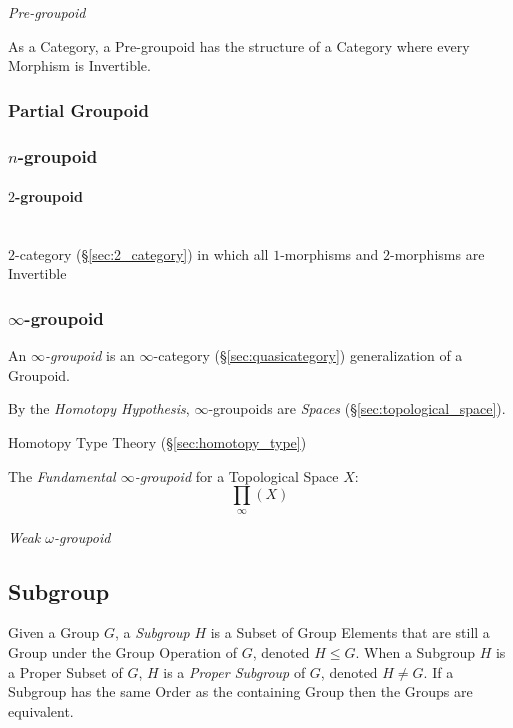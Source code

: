 \emph{Pre-groupoid}

As a Category, a Pre-groupoid has the structure of a Category where
every Morphism is Invertible.



\subsubsection{Partial Groupoid}\label{sec:partial_groupoid}

\subsubsection{$n$-groupoid}\label{sec:n_groupoid}

\paragraph{$2$-groupoid}\label{sec:2_groupoid}
\hfill \\

$2$-category (\S\ref{sec:2_category}) in which all $1$-morphisms and
$2$-morphisms are Invertible



\subsubsection{$\infty$-groupoid}\label{sec:infinity_groupoid}

An \emph{$\infty$-groupoid} is an $\infty$-category
(\S\ref{sec:quasicategory}) generalization of a Groupoid.

By the \emph{Homotopy Hypothesis}, $\infty$-groupoids are \emph{Spaces}
(\S\ref{sec:topological_space}).

Homotopy Type Theory (\S\ref{sec:homotopy_type})

The \emph{Fundamental $\infty$-groupoid} for a Topological Space $X$:
\[
  \prod_\infty(X)
\]

\emph{Weak $\omega$-groupoid}



\subsection{Subgroup}\label{sec:subgroup}

Given a Group $G$, a \emph{Subgroup} $H$ is a Subset of Group Elements
that are still a Group under the Group Operation of $G$, denoted $H
\leq G$. When a Subgroup $H$ is a Proper Subset of $G$, $H$ is a
\emph{Proper Subgroup} of $G$, denoted $H \neq G$. If a Subgroup has
the same Order as the containing Group then the Groups are equivalent.

